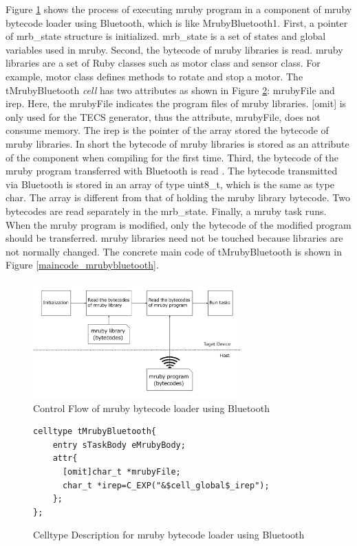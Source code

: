 \documentclass[conference,compsoc]{IEEEtran}
\begin{document}
Figure \ref{fig:control_flow} shows the process of executing mruby program in a component of mruby bytecode loader using Bluetooth, which is like MrubyBluetooth1.
First, a pointer of mrb\_state structure is initialized.
mrb\_state is a set of states and global variables used in mruby.
Second, the bytecode of mruby libraries is read.
mruby libraries are a set of Ruby classes such as motor class and sensor class.
For example, motor class defines methods to rotate and stop a motor.
The tMrubyBluetooth {\it cell} has two attributes as shown in Figure \ref{celltype_mrubybluetooth}: mrubyFile and irep.
Here, the mrubyFile indicates the program files of mruby libraries.
[omit] is only used for the TECS generator, thus the attribute, mrubyFile, does not consume memory.
The irep is the pointer of the array stored the bytecode of mruby libraries.
In short the bytecode of mruby libraries is stored as an attribute of the component when compiling for the first time.
Third, the bytecode of the mruby program transferred with Bluetooth is read .
The bytecode transmitted via Bluetooth is stored in an array of type uint8\_t, which is the same as type char.
The array is different from that of holding the mruby library bytecode.
Two bytecodes are read separately in the mrb\_state.
Finally, a mruby task runs.
When the mruby program is modified, only the bytecode of the modified program should be transferred.
mruby libraries need not be touched because libraries are not normally changed.
The concrete main code of tMrubyBluetooth is shown in Figure \ref{maincode_mrubybluetooth}.
\begin{figure}[t]
    \centering
    \includegraphics[width=8cm,clip]{figure/control_flow.pdf}
    \caption{Control Flow of mruby bytecode loader using Bluetooth}
    \label{fig:control_flow}
\end{figure}
\begin{figure}[t]
\centering
\begin{lstlisting}
celltype tMrubyBluetooth{
    entry sTaskBody eMrubyBody;
    attr{
      [omit]char_t *mrubyFile;
      char_t *irep=C_EXP("&$cell_global$_irep");
    };
}; 
\end{lstlisting}
\caption{Celltype Description for mruby bytecode loader using Bluetooth}
\label{celltype_mrubybluetooth}
\end{figure}
\end{document}
